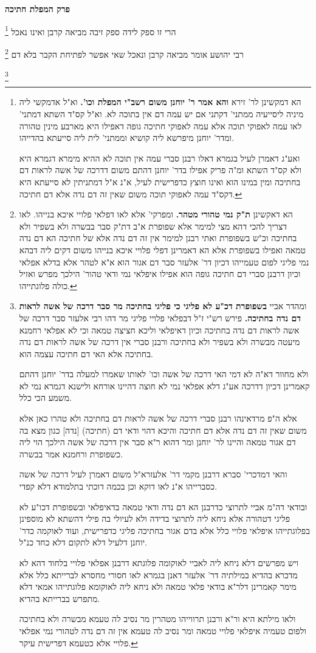 \documentclass[12pt, openany]{book}
\newcommand{\sethebfont}{
\fontsize{10.5pt}{21.0pt} \selectfont
}
\newcommand{\twocol}[1]{
	{\sethebfont \begin{multicols}{2}
			#1
	\end{multicols}}	
}
\newcommand{\chapname}{}
\newcommand{\newchap}[1]{
	\addcontentsline{toc}{chapter}{#1}
	\renewcommand{\chapname}{#1}
		\begin{center}
			\textbf{%
\fontsize{16pt}{16pt}\selectfont
				#1}
		\end{center}
}
\newcommand{\footnotecomment}[1]{
	\renewcommand\thefootnote{}
	\footnote{#1}}
\newcommand{\commenta}[1]{\footnotecomment{#1}}
\begin{document}
\newchap{פרק  המפלת חתיכה}
\twocol{
\commenta{ הא דמקשינן לר' זירא \textbf{והא אמר ר' יוחנן משום רשב"י המפלת וכו'.} וא"ל אדמקשי ליה מיניה ליסייעיה ממתני' דקתני אם יש עמה דם אין בתוכה לא. וא"ל קס"ד השתא דמתני' לאו עמה לאפוקי תוכה אלא עמה לאפוקי חתיכה גופה דאפילו היא מארבע מינין טהורה ומדר' יוחנן מיפרשא ליה קושיא וממתני' לית ליה סייעתא בהדייהו.\par ואע"ג דאמרן לעיל בגמרא דאלו רבנן סברי עמה אין תוכה לא ההיא מימרא דגמרא היא ולא קס"ד השתא ומ"ה פריק אפילו בדר' יוחנן דהתם משום דדרכה של אשה לראות דם בחתיכה ומין במינו הוא ואינו חוצץ כדפרישית לעיל, א"נ א"ל דמתניתין לא סייעתא היא דקס"ד עמה לאפוקי תוכה משום שאין זה דם נדה אלא דם חתיכה. }
הרי זו ספק לידה ספק זיבה מביאה קרבן ואינו נאכל 
\commenta{ הא דאקשינן \textbf{ת"ק נמי טהורי מטהר.} ומפרקי' אלא לאו דפלאי פלויי איכא בנייהו. לאו דצריך להכי דהא מצי למימר אלא שפופרת א"ב דת"ק סבר בבשרה ולא בשפיר ולא בחתיכה וכ"ש בשפופרת ואתי רבנן למימר אין זה דם נדה אלא של חתיכה הא דם נדה טמאה ואפילו בשפופרת אלא הא דאמרינן דפלי פלויי איכא בנייהו משום דקים ליה דבהא נמי פליגי לפום טעמייהו דכיון דר' אלעזר סבר דם אגור הוא א"א לטהר אלא בדלא אפלאי וכיון דרבנן סברי דם חתיכה גופה הוא אפילו איפלאי נמי ודאי טהור' הילכך מפרש ואזיל כולה פלוגתייהו. }
רבי יהושע אומר מביאה קרבן ונאכל שאי אפשר לפתיחת הקבר בלא דם 
\commenta{ ומהדר אביי \textbf{בשפופרת דכ"ע לא פליגי כי פליגי בחתיכה מר סבר דרכה של אשה לראות דם נדה בחתיכה.} פירש רש"י ז"ל דבפלאי פלויי פליגי מר דהו רבי אלעזר סבר דרכה של אשה לראות דם נדה בחתיכה וכיון דאיפלאי וליכא חציצה טמאה וכי לא אפלאי רחמנא מיעטה מבשרה ולא בשפיר ולא בחתיכה ורבנן סברי אין דרכה של אשה לראות דם נדה בחתיכה אלא האי דם חתיכה עצמה הוא.\par ולא מחוור דא"ה לא דמי האי דרכה של אשה וכו' לאותו שאמרו למעלה בדר' יוחנן דהתם קאמרינן דכיון דדרכה אע"ג דלא אפלאי נמי לא חוצה דהיינו אורחא ולישנא דגמרא נמי לא משמע הכי כלל.\par אלא ה"פ מרדאינהו רבנן סברי דרכה של אשה לראות דם בחתיכה ולא טהרו כאן אלא משום שאין זה דם נדה אלא דם חתיכה והיכא דהוי ודאי דם (חתיכה) [נדה] כגון מצא בה דם אגור טמאה והיינו לר' יוחנן ומר דהוא ר"א סבר אין דרכה של אשה הילכך הוי ליה כשפופרת ורחמנא אמר בבשרה.\par והאי דמדכרי' סברא דרבנן מקמי דר' אלעזרא"ל משום דאמרן לעיל דרכה של אשה כסברייהו א"נ לאו דוקא וכן בכמה דוכתי בתלמודא דלא קפדי.\par ובודאי דה"מ אביי לתרוצי כדרבנן הא דם נדה ודאי טמאה בדאיפלאי ובשפופרת דכו"ע לא פליגי דטהורה אלא ניחא ליה לתרוצי בדידה ולא לעיולי בה פילי דהשתא לא מוספינן בפלוגתייהו איפלאי פלויי כלל אלא בדם אגור בחתיכה פליגי כדפרישית, ועוד לאוקמה כדר' יוחנן דלעיל דלא לתקום דלא כחד כנ"ל.\par ויש מפרשים דלא ניחא ליה לאביי לאוקומה פלוגתא דרבנן אפלאי פלויי בלחוד דהא לא מדכרא בהדיא במילתיה דר' אלעזר דאנן בגמרא לאו חסורי מחסרא לברייתא כלל אלא מימר קאמרינן דלר"א בודאי פלאי טמאה ולא ניחא ליה לאוקומא פלוגתייהו אמאי דלא מתפרש בברייתא בהדיא.\par ולאו מילתא היא ור"א ורבנן תרווייהו מטהרין מר נסיב לה טעמא מבשרה ולא בחתיכה ולפום טעמיה איפלאי פלויי טמאה ומר נסיב לה טעמא אין זה דם נדה לטהורי נמי אפלאי פלויי אלא כטעמא דפרישית עיקר. }
}
\end{document}
